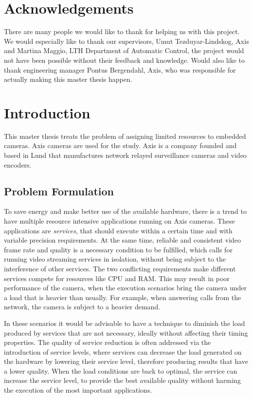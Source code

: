 \documentclass[nobiblatex]{LTHthesis}
\begin{document}
\chapter*{Acknowledgements}

There are many people we would like to thank for helping us with this project. We would especially like to thank our supervisors, Umut Tezduyar-Lindskog, Axis and Martina Maggio, LTH Department of Automatic Control, the project would not have been possible without their feedback and knowledge. Would also like to thank engineering manager Pontus Bergendahl, Axis, who was responsible for actually making this master thesis happen.


\tableofcontents
\newpage

\setcounter{page}{1}

\chapter{Introduction}

This master thesis treats the problem of assigning limited resources to
embedded cameras. Axis cameras are used for the study. Axis is a company
founded and based in Lund that manufactures network relayed surveillance
cameras and video encoders.

\section{Problem Formulation}

To save energy and make better use of the available hardware, there is a
trend to have multiple resource intensive applications running on Axis
cameras. These applications are \emph{services}, that should execute within
a certain time and with variable precision requirements. At the same time,
reliable and consistent video frame rate and quality is a necessary
condition to be fulfilled, which calls for running video streaming
services in isolation, without being subject to the interference of
other services. The two conflicting requirements make different services 
compete for resources like CPU and RAM. This may result in poor performance 
of the camera, when the execution scenarios bring the camera under a load
that is heavier than usually. For example, when answering calls
from the network, the camera is subject to a heavier demand. 

In these scenarios it would be advisable to have a technique to diminish
the load produced by services that are not necessary, ideally without
affecting their timing properties. The quality of service reduction is
often addressed via the introduction of service levels, where services can
decrease the load generated on the hardware by lowering their service level,
therefore producing results that have a lower quality. When the load
conditions are back to optimal, the service can increase the service level,
to provide the best available quality without harming the execution of the
most important applications.
\end{document}
